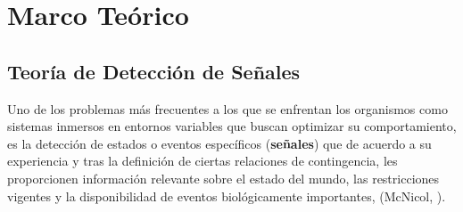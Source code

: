 \chapter{Marco Teórico} %

\label{Cap_SDT} %


\newcommand{\keyword}[1]{\textbf{#1}}
\newcommand{\tabhead}[1]{\textbf{#1}}
\newcommand{\code}[1]{\texttt{#1}}
\newcommand{\file}[1]{\texttt{\bfseries#1}}
\newcommand{\option}[1]{\texttt{\itshape#1}}


\section{Teoría de Detección de Señales}

Uno de los problemas más frecuentes a los que se enfrentan los organismos como sistemas inmersos en entornos variables que buscan optimizar su comportamiento, es la detección de estados o eventos específicos (\textbf{señales}) que de acuerdo a su experiencia y tras la definición de ciertas relaciones de contingencia, les proporcionen información relevante sobre el estado del mundo, las restricciones vigentes y la disponibilidad de eventos biológicamente importantes, (McNicol, \citeyear{McNicol1}).\\

